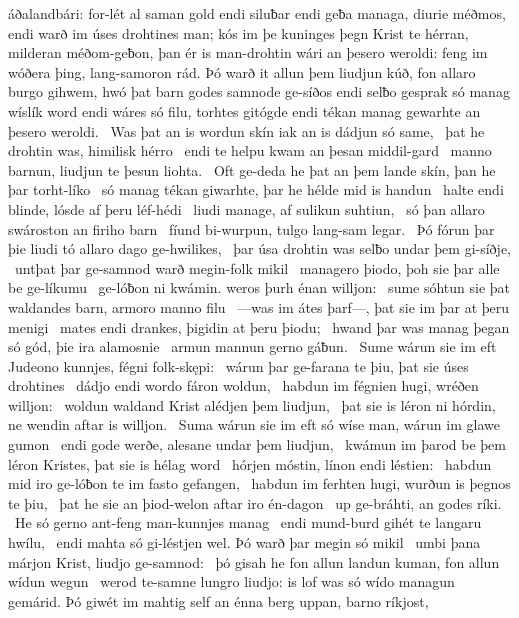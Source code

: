 áðalandbári: for-lét al saman
gold endi siluƀar endi geƀa managa,
diurie méðmos, endi warð im úses drohtines man;
kós im þe kuninges þegn Krist te hérran,
milderan méðom-geƀon, þan ér is man-drohtin
wári an þesero weroldi: feng im wóðera þing,
lang-samoron rád. Þó warð it allun þem liudjun kúð,
fon allaro burgo gihwem, hwó þat barn godes
samnode ge-síðos endi selƀo gesprak
só manag wíslík word endi wáres só filu,
torhtes gitógde endi tékan manag
gewarhte an þesero weroldi. \hld\ Was þat an is wordun skín
iak an is dádjun só same, \hld\ þat he drohtin was,
himilisk hérro \hld\ endi te helpu kwam
an þesan middil-gard \hld\ manno barnun,
liudjun te þesun liohta. \hld\ Oft ge-deda he þat an þem lande skín,
þan he þar torht-líko \hld\ só manag tékan giwarhte,
þar he hélde mid is handun \hld\ halte endi blinde,
lósde af þeru léf-hédi \hld\ liudi manage,
af sulikun suhtiun, \hld\ só þan allaro swároston
an firiho barn \hld\ fíund bi-wurpun,
tulgo lang-sam legar. \hld\ Þó fórun þar þie liudi tó
allaro dago ge-hwilikes, \hld\ þar úsa drohtin was
selƀo undar þem gi-síðje, \hld\ untþat þar ge-samnod warð
megin-folk mikil \hld\ managero þiodo,
þoh sie þar alle be ge-líkumu \hld\ ge-lóƀon ni kwámin.
weros þurh énan willjon: \hld\ sume sóhtun sie þat waldandes barn,
armoro manno filu \hld\ —was im átes þarf—,
þat sie im þar at þeru menigi \hld\ mates endi drankes,
þigidin at þeru þiodu; \hld\ hwand þar was manag þegan só gód,
þie ira alamosnie \hld\ armun mannun
gerno gáƀun. \hld\ Sume wárun sie im eft Judeono kunnjes,
fégni folk-skępi: \hld\ wárun þar ge-farana te þiu,
þat sie úses drohtines \hld\ dádjo endi wordo
fáron woldun, \hld\ habdun im fégnien hugi,
wréðen willjon: \hld\ woldun waldand Krist
alédjen þem liudjun, \hld\ þat sie is léron ni hórdin,
ne wendin aftar is willjon. \hld\ Suma wárun sie im eft só wíse man,
wárun im glawe gumon \hld\ endi gode werðe,
alesane undar þem liudjun, \hld\ kwámun im þarod be þem léron Kristes,
þat sie is hélag word \hld\ hórjen móstin,
línon endi léstien: \hld\ habdun mid iro ge-lóƀon te im
fasto gefangen, \hld\ habdun im ferhten hugi,
wurðun is þegnos te þiu, \hld\ þat he sie an þiod-welon
aftar iro én-dagon \hld\ up ge-bráhti,
an godes ríki. \hld\ He só gerno ant-feng
man-kunnjes manag \hld\ endi mund-burd gihét
te langaru hwílu, \hld\ endi mahta só gi-léstjen wel.
Þó warð þar megin só mikil \hld\ umbi þana márjon Krist,
liudjo ge-samnod: \hld\ þó gisah he fon allun landun kuman,
fon allun wídun wegun \hld\ werod te-samne
lungro liudjo: is lof was só wído
managun gemárid. Þó giwét im mahtig self
an énna berg uppan, barno ríkjost,
